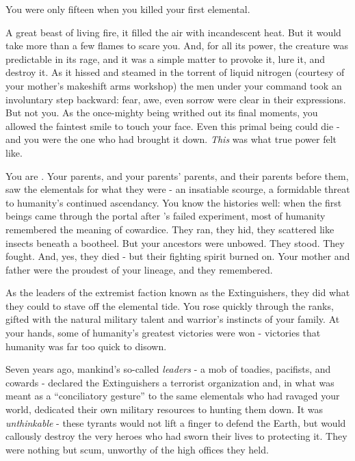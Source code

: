 \documentclass[char]{elementals}
\begin{document}
\name{\cDema{}}

You were only fifteen when you killed your first elemental. 

A great beast of living fire, it filled the air with incandescent heat. But it would take more than a few flames to scare you. And, for all its power, the creature was predictable in its rage, and it was a simple matter to provoke it, lure it, and destroy it. As it hissed and steamed in the torrent of liquid nitrogen (courtesy of your mother's makeshift arms workshop) the men under your command took an involuntary step backward: fear, awe, even sorrow were clear in their expressions. But not you. As the once-mighty being writhed out its final moments, you allowed the faintest smile to touch your face. Even this primal being could die - and you were the one who had brought it down. \emph{This} was what true power felt like.

You are \cDema{\intro{}}. Your parents, and your parents' parents, and their parents before them, saw the elementals for what they were - an insatiable scourge, a formidable threat to humanity's continued ascendancy. You know the histories well: when the first beings came through the portal after \cGrandfather{\intro{}}'s failed experiment, most of humanity remembered the meaning of cowardice. They ran, they hid, they scattered like insects beneath a bootheel. But your ancestors were unbowed. They stood. They fought. And, yes, they died - but their fighting spirit burned on. Your mother and father were the proudest of your lineage, and they remembered.

As the leaders of the extremist faction known as the Extinguishers, they did what they could to stave off the elemental tide. You rose quickly through the ranks, gifted with the natural military talent and warrior's instincts of your family. At your hands, some of humanity's greatest victories were won - victories that humanity was far too quick to disown. 

Seven years ago, mankind's so-called \emph{leaders} - a mob of toadies, pacifists, and cowards - declared the Extinguishers a terrorist organization and, in what was meant as a ``conciliatory gesture'' to the same elementals who had ravaged your world, dedicated their own military resources to hunting them down. It was \emph{unthinkable} - these tyrants would not lift a finger to defend the Earth, but would callously destroy the very heroes who had sworn their lives to protecting it. They were nothing but scum, unworthy of the high offices they held.
\end{document}
